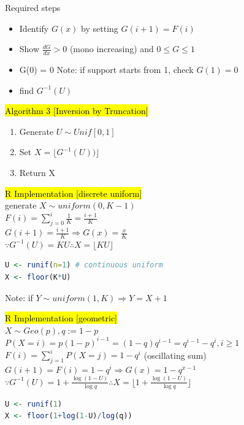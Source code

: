 \documentclass[a4paper,12pt,landscape]{article}
\begin{document}
\begin{multicols}{3}
		Required steps
		\begin{itemize}
			\item Identify $G(x)$ by setting $G(i+1)=F(i)$
			\item Show $\frac{dG}{dx}>0 $ (mono increasing) and $0\leq G \leq 1$
			\item G(0) = 0
                \subitem Note: if support starts from 1, check $G(1)=0$
			\item find $G^{-1}(U)$
		\end{itemize}

		\hl{Algorithm 3 [Inversion by Truncation]}
		\begin{enumerate}
			\item Generate $U\sim Unif[0, 1]$
			\item Set $X = \lfloor G^{-1}(U)) \rfloor$
			\item Return X
		\end{enumerate}
	
		\hl{R Implementation [discrete uniform]}\\
		generate $X\sim uniform(0, K-1)$\\
		$F(i) = \sum_{j=0}^i\frac{1}{K}=\frac{i+1}{K}$\\
		$G(i+1) = \frac{i+1}{K} \Rightarrow G(x)=\frac{x}{K}$\\
		$\because G^{-1}(U) = KU \therefore X = \lfloor{KU}\rfloor $
		\begin{lstlisting}[language=R]
U <- runif(n=1) # continuous uniform
X <- floor(K*U)
		\end{lstlisting}
		Note: if $Y\sim uniform(1, K) \Rightarrow Y = X + 1$
		
		\hl{R Implementation [geometric]}\\
		$X\sim Geo(p), q:=1-p$\\
		$P(X=i)=p(1-p)^{i-1}=(1-q)q^{i-1}=q^{i-1}-q^i, i\geq 1$\\
		$F(i)=\sum_{j=1}^iP(X=j)=1-q^i$ (oscillating sum)
		$G(i+1)=F(i)=1-q^i \Rightarrow G(x) = 1-q^{x-1}$\\
		$\because G^{-1}(U) = 1 + \frac{\log(1-U)}{\log q} \therefore X = \lfloor 1 + \frac{\log(1-U)}{\log q} \rfloor$
		\begin{lstlisting}[language=R]
U <- runif(1)
X <- floor(1+log(1-U)/log(q))
		\end{lstlisting}


\end{multicols}
\end{document}
